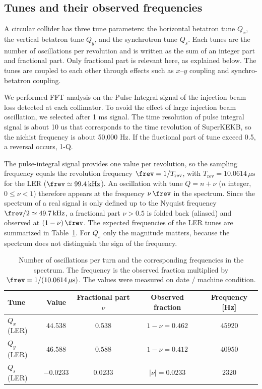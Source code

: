 \subsection{Tunes and their observed frequencies}
A circular collider has three tune parameters: the horizontal betatron tune $Q_x$, the vertical betatron tune $Q_y$, and the synchrotron tune $Q_s$. Each tunes are the number of oscillations per revolution and is written as the sum of an integer part and fractional part. Only fractional part is relevant here, as explained below. The tunes are coupled to each other through effects such as $x$--$y$ coupling and synchro-betatron coupling. 


We performed FFT analysis on the Pulse Integral signal of the injection beam loss detected at each collimator. To avoid the effect of large injection beam oscillation, we selected after 1 ms signal. The time resolution of pulse integral signal is about 10 us that corresponds to the time revolution of SuperKEKB, so the nichist frequency is about 50,000 Hz. If the fluctional part of tune exceed 0.5, a reversal occurs, 1-Q. 

The pulse-integral signal provides one value per revolution, so the sampling frequency equals the revolution frequency $\frev = 1/T_{\mathrm{rev}}$, with $T_{\mathrm{rev}} = 10.0614\,\mu\mathrm{s}$ for the LER ($\frev \simeq 99.4\,\mathrm{kHz}$). An oscillation with tune $Q = n + \nu$ ($n$ integer, $0 \le \nu < 1$) therefore appears at the frequency $\nu\,\frev$ in the spectrum. Since the spectrum of a real signal is only defined up to the Nyquist frequency $\frev/2 \simeq 49.7\,\mathrm{kHz}$, a fractional part $\nu > 0.5$ is folded back (aliased) and observed at $(1-\nu)\, \frev$. The expected frequencies of the LER tunes are summarized in Table~\ref{tab:oscillation_frequency}. For $Q_s$ only the magnitude matters, because the spectrum does not distinguish the sign of the frequency. 

\begin{table}[htbp]
    \centering
    \begin{tabular}{lcccc}
        \hline
        Tune & Value & Fractional part $\nu$ & Observed fraction & Frequency [Hz] \\
        \hline
        $Q_x$ (LER) & $44.538$  & $0.538$   & $1-\nu = 0.462$  & $45920$ \\
        $Q_y$ (LER) & $46.588$  & $0.588$   & $1-\nu = 0.412$  & $40950$ \\
        $Q_s$ (LER) & $-0.0233$ & $0.0233$  & $|\nu| = 0.0233$ & $2320$  \\
        \hline
    \end{tabular}
    \caption{Number of oscillations per turn and the corresponding frequencies in the spectrum.
    The frequency is the observed fraction multiplied by $\frev = 1/(10.0614\,\mu\mathrm{s})$.
    The values were measured on {date / machine condition}.}
    \label{tab:oscillation_frequency}
\end{table}


